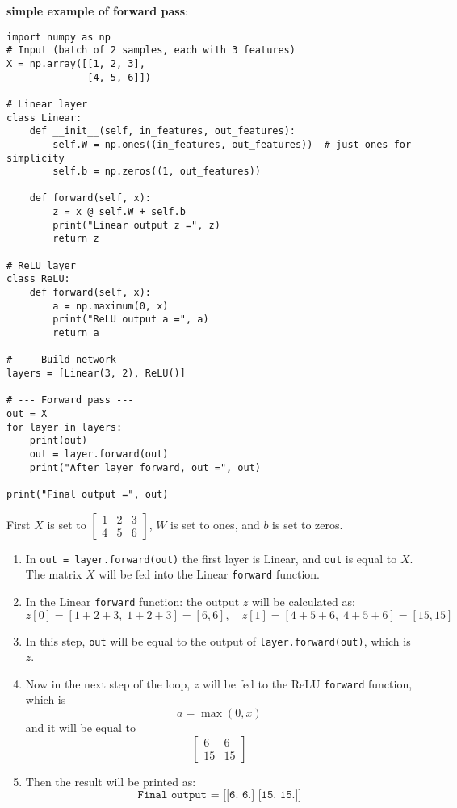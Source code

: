 \documentclass{article}
\newenvironment{cheatformula}[1][כותרת]{
    \begin{minipage}{\linewidth}
    \textbf{#1}: \\
}{
    \end{minipage}\\[0ex]
}
\begin{document}
\begin{cheatformula}[simple example of forward pass]
\begin{lstlisting}
import numpy as np
# Input (batch of 2 samples, each with 3 features)
X = np.array([[1, 2, 3],
              [4, 5, 6]])

# Linear layer
class Linear:
    def __init__(self, in_features, out_features):
        self.W = np.ones((in_features, out_features))  # just ones for simplicity
        self.b = np.zeros((1, out_features))
    
    def forward(self, x):
        z = x @ self.W + self.b
        print("Linear output z =", z)
        return z

# ReLU layer
class ReLU:
    def forward(self, x):
        a = np.maximum(0, x)
        print("ReLU output a =", a)
        return a

# --- Build network ---
layers = [Linear(3, 2), ReLU()]

# --- Forward pass ---
out = X
for layer in layers:
    print(out)
    out = layer.forward(out)
    print("After layer forward, out =", out)

print("Final output =", out)
\end{lstlisting}
First $X$ is set to $\begin{bmatrix}1 & 2 & 3 \\ 4 & 5 & 6\end{bmatrix}$, 
$W$ is set to ones, and $b$ is set to zeros.

\begin{enumerate}
  \item In \texttt{out = layer.forward(out)} the first layer is Linear, and 
  \texttt{out} is equal to $X$. The matrix $X$ will be fed into the Linear 
  \texttt{forward} function.

  \item In the Linear \texttt{forward} function: the output $z$ will be 
  calculated as: 
  \[
    z[0] = [1+2+3, \; 1+2+3] = [6, 6], \quad
    z[1] = [4+5+6, \; 4+5+6] = [15, 15]
  \]

  \item In this step, \texttt{out} will be equal to the output of 
  \texttt{layer.forward(out)}, which is $z$.

  \item Now in the next step of the loop, $z$ will be fed to the ReLU 
  \texttt{forward} function, which is 
  \[
    a = \max(0, x)
  \]
  and it will be equal to 
  \[
    \begin{bmatrix} 6 & 6 \\ 15 & 15 \end{bmatrix}
  \]

  \item Then the result will be printed as: 
  \[
    \texttt{Final output = [[6. 6.] [15. 15.]]}
  \]
\end{enumerate}
\end{cheatformula}



\newpage
\end{document}
